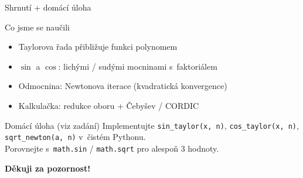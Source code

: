 \documentclass[12pt]{beamer}
\begin{document}
\begin{frame}{Shrnutí + domácí úloha}

    \begin{block}{Co jsme se naučili}
        \begin{itemize}
            \item Taylorova řada přibližuje funkci polynomem
            \item $\sin$ a $\cos$: lichými / sudými mocninami s~faktoriálem
            \item Odmocnina: Newtonova iterace (kvadratická konvergence)
            \item Kalkulačka: redukce oboru + Čebyšev / CORDIC
        \end{itemize}
    \end{block}

    \pause
    \begin{exampleblock}{Domácí úloha (viz zadání)}
        Implementujte \texttt{sin\_taylor(x, n)},
        \texttt{cos\_taylor(x, n)}, \texttt{sqrt\_newton(a, n)}
        v~čistém Pythonu.\\
        Porovnejte s~\texttt{math.sin} / \texttt{math.sqrt}
        pro alespoň 3 hodnoty.
    \end{exampleblock}

    \bigskip
    \centering
    \textbf{Děkuji za pozornost!}

\end{frame}
\end{document}
